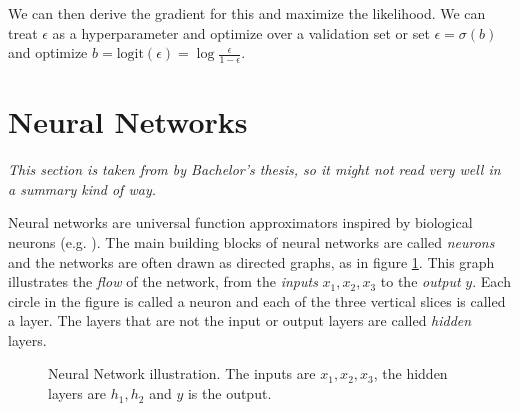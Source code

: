 \documentclass{article}
\begin{document}
We can then derive the gradient for this and maximize the likelihood. We can treat $\epsilon$ as a hyperparameter and optimize over a validation set or set $\epsilon = \sigma(b)$ and optimize $b = \text{logit}(\epsilon) = \log \frac{\epsilon}{1 - \epsilon}$.


\section{Neural Networks}
\label{sec:nn_intro}
\textit{This section is taken from by Bachelor's thesis, so it might not read very well in a summary kind of way.}
\vskip 0.1in

Neural networks are universal function approximators inspired by biological neurons (e.g. \cite[Chapter~6]{goodfellow_deep_2016}). The main building blocks of neural networks are called \textit{neurons} and the networks are often drawn as directed graphs, as in figure \ref{fig:neural_net}. This graph illustrates the \textit{flow} of the network, from the \textit{inputs} $x_1, x_2, x_3$ to the \textit{output} $y$. Each circle in the figure is called a neuron and each of the three vertical slices is called a layer. The layers that are not the input or output layers are called \textit{hidden} layers.

\begin{figure}
    \centering
    
    \caption[Neural network example]{Neural Network illustration. The inputs are $x_1, x_2, x_3$, the hidden layers are $h_1, h_2$ and $y$ is the output.}
    \label{fig:neural_net}
\end{figure}
\end{document}
